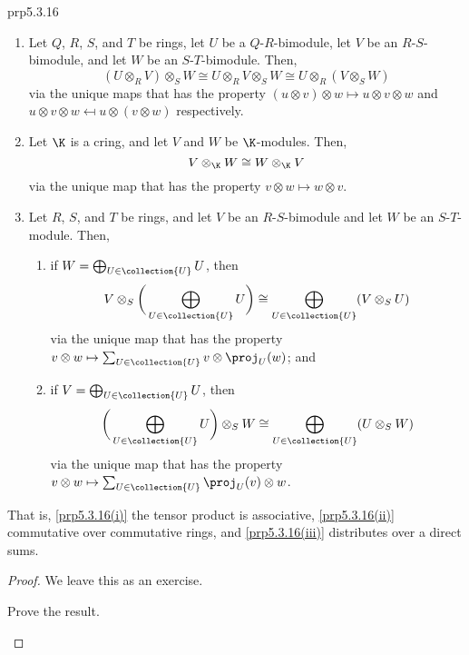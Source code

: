\begin{prp}{}{prp5.3.16}
	\begin{enumerate}
		\item \label{prp5.3.16(i)}Let $Q$, $R$, $S$, and $T$ be rings, let $U$ be a $Q$-$R$-bimodule, let $V$ be an $R$-$S$-bimodule, and let $W$ be an $S$-$T$-bimodule.  Then,
		\begin{equation}
		(U\otimes _RV)\otimes _SW\cong U\otimes _RV\otimes _SW\cong U\otimes _R(V\otimes _SW)
		\end{equation}
		via the unique maps that has the property $(u\otimes v)\otimes w\mapsto u\otimes v\otimes w$ and $u\otimes v\otimes w\mapsfrom u\otimes (v\otimes w)$ respectively.
		\item \label{prp5.3.16(ii)}Let $\K$ is a cring, and let $V$ and $W$ be $\K$-modules.  Then,
		\begin{equation}
		V\otimes _{\K}W\cong W\otimes _{\K}V
		\end{equation}
		via the unique map that has the property $v\otimes w\mapsto w\otimes v$.
		\item \label{prp5.3.16(iii)}Let $R$, $S$, and $T$ be rings, and let $V$ be an $R$-$S$-bimodule and let $W$ be an $S$-$T$-module.  Then,
		\begin{enumerate}
			\item if $W=\bigoplus _{U\in \collection{U}}U$, then
			\begin{equation}
			V\otimes _S\bigg( \bigoplus _{U\in \collection{U}}U\bigg) \cong \bigoplus _{U\in \collection{U}}(V\otimes _SU)
			\end{equation}
			via the unique map that has the property $v\otimes w\mapsto \sum _{U\in \collection{U}}v\otimes \proj _U(w)$; and
			\item if $V=\bigoplus _{U\in \collection{U}}U$, then
			\begin{equation}
			\bigg( \bigoplus _{U\in \collection{U}}U\bigg) \otimes _SW\cong \bigoplus _{U\in \collection{U}}(U\otimes _SW)
			\end{equation}
			via the unique map that has the property $v\otimes w\mapsto \sum _{U\in \collection{U}}\proj _U(v)\otimes w$.
		\end{enumerate}
	\end{enumerate}
	\begin{rmk}
		That is, \cref{prp5.3.16(i)} the tensor product is associative, \cref{prp5.3.16(ii)} commutative over commutative rings, and \cref{prp5.3.16(iii)} distributes over a direct sums.
	\end{rmk}
	\begin{proof}
		We leave this as an exercise.
		\begin{exr}[breakable=false]{}{}
			Prove the result.
		\end{exr}
	\end{proof}
\end{prp}

